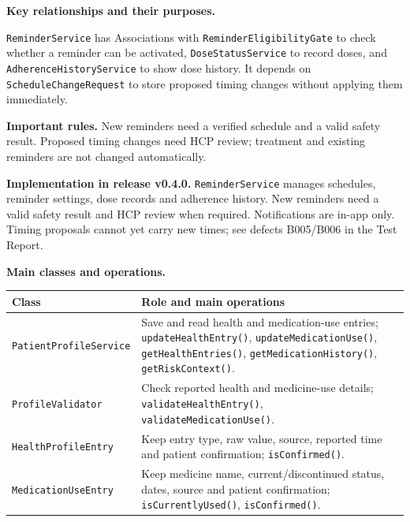\documentclass[10pt,letterpaper]{article}
\newenvironment{updated}{\par\color{pafourblue}}{\par}
\begin{document}
\noindent\textbf{Key relationships and their purposes.}\par\smallskip
\texttt{ReminderService} has Associations with
\texttt{ReminderEligibilityGate} to check whether a reminder can be
activated, \texttt{DoseStatusService} to record doses, and
\texttt{AdherenceHistoryService} to show dose history. It depends on
\texttt{ScheduleChangeRequest} to store proposed timing changes without
applying them immediately.

\noindent\textbf{Important rules.} New reminders need a verified schedule and
a valid safety result. Proposed timing changes need HCP review; treatment
and existing reminders are not changed automatically.

\begin{updated}
\noindent\textbf{Implementation in release v0.4.0.} \texttt{ReminderService}
manages schedules, reminder settings, dose records and adherence history.
New reminders need a valid safety result and HCP review when required.
Notifications are in-app only. Timing proposals cannot yet carry new times;
see defects B005/B006 in the Test Report.
\end{updated}



\noindent\textbf{Main classes and operations.}\par\smallskip
\begingroup\small
\noindent\begin{tabularx}{\textwidth}{|L{0.37\textwidth}|Y|}
\hline
\textbf{Class} & \textbf{Role and main operations} \\ \hline
\texttt{PatientProfileService} & Save and read health and medication-use entries; \texttt{updateHealthEntry()}, \texttt{updateMedicationUse()}, \texttt{getHealthEntries()}, \texttt{getMedicationHistory()}, \texttt{getRiskContext()}. \\ \hline
\texttt{ProfileValidator} & Check reported health and medicine-use details; \texttt{validateHealthEntry()}, \texttt{validateMedicationUse()}. \\ \hline
\texttt{HealthProfileEntry} & Keep entry type, raw value, source, reported time and patient confirmation; \texttt{isConfirmed()}. \\ \hline
\texttt{MedicationUseEntry} & Keep medicine name, current/discontinued status, dates, source and patient confirmation; \texttt{isCurrentlyUsed()}, \texttt{isConfirmed()}. \\ \hline
\end{tabularx}\par
\endgroup
\end{document}
